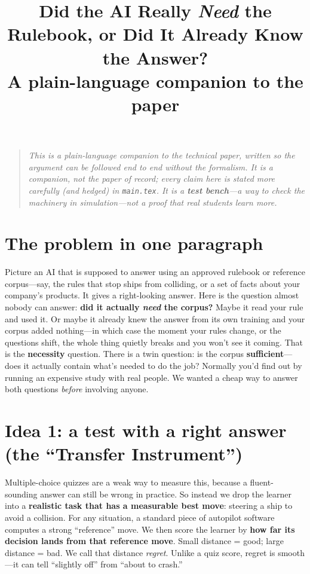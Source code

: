 \documentclass[11pt]{article}
\title{\textbf{Did the AI Really \emph{Need} the Rulebook, or Did It Already Know the Answer?}\\[4pt]
\large A plain-language companion to the paper}
\author{}
\date{}
\begin{document}
\maketitle

\begin{quote}
\small\emph{This is a plain-language companion to the technical paper, written so the argument can
be followed end to end without the formalism. It is a companion, not the paper of record; every
claim here is stated more carefully (and hedged) in \texttt{main.tex}. It is a \textbf{test
bench}---a way to check the machinery in simulation---not a proof that real students learn more.}
\end{quote}

\section*{The problem in one paragraph}

Picture an AI that is supposed to answer using an approved rulebook or reference corpus---say,
the rules that stop ships from colliding, or a set of facts about your company's products. It
gives a right-looking answer. Here is the question almost nobody can answer: \textbf{did it
actually \emph{need} the corpus?} Maybe it read your rule and used it. Or maybe it already knew
the answer from its own training and your corpus added nothing---in which case the moment your
rules change, or the questions shift, the whole thing quietly breaks and you won't see it
coming. That is the \textbf{necessity} question. There is a twin question: is the corpus
\textbf{sufficient}---does it actually contain what's needed to do the job? Normally you'd find
out by running an expensive study with real people. We wanted a cheap way to answer both
questions \emph{before} involving anyone.

\section*{Idea 1: a test with a right answer (the ``Transfer Instrument'')}

Multiple-choice quizzes are a weak way to measure this, because a fluent-sounding answer can
still be wrong in practice. So instead we drop the learner into a \textbf{realistic task that
has a measurable best move}: steering a ship to avoid a collision. For any situation, a
standard piece of autopilot software computes a strong ``reference'' move. We then score the
learner by \textbf{how far its decision lands from that reference move}. Small distance = good;
large distance = bad. We call that distance \emph{regret}. Unlike a quiz score, regret is
smooth---it can tell ``slightly off'' from ``about to crash.''
\end{document}

